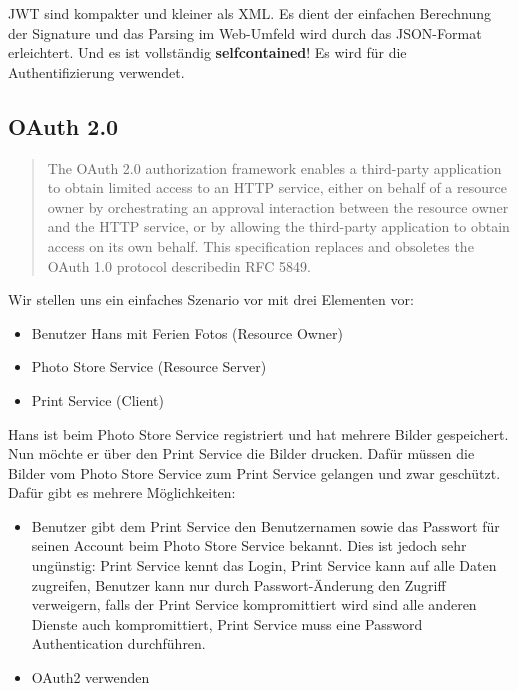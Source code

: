 JWT sind kompakter und kleiner als XML. Es dient der einfachen Berechnung der Signature und das Parsing im Web-Umfeld wird durch das JSON-Format erleichtert. Und es ist vollständig \textbf{selfcontained}! Es wird für die Authentifizierung verwendet.

\subsection{OAuth 2.0}



\begin{quote}
The OAuth 2.0 authorization framework enables a third-party
application to obtain limited access to an HTTP service, either on
behalf of a resource owner by orchestrating an approval interaction
between the resource owner and the HTTP service, or by allowing
the third-party application to obtain access on its own behalf. This
specification replaces and obsoletes the OAuth 1.0 protocol
describedin RFC 5849.
\end{quote}

Wir stellen uns ein einfaches Szenario vor mit drei Elementen vor:

\begin{itemize}
	\item Benutzer Hans mit Ferien Fotos (Resource Owner)
	\item Photo Store Service (Resource Server)
	\item Print Service (Client)
\end{itemize}

Hans ist beim Photo Store Service registriert und hat mehrere Bilder gespeichert. Nun möchte er über den Print Service die Bilder drucken. Dafür müssen die Bilder vom Photo Store Service zum Print Service gelangen und zwar geschützt. Dafür gibt es mehrere Möglichkeiten:

\begin{itemize}
	\item Benutzer gibt dem Print Service den Benutzernamen sowie das Passwort für seinen Account beim Photo Store Service bekannt. Dies ist jedoch sehr ungünstig: Print Service kennt das Login, Print Service kann auf alle Daten zugreifen, Benutzer kann nur durch Passwort-Änderung den Zugriff verweigern, falls der Print Service kompromittiert wird sind alle anderen Dienste auch kompromittiert, Print Service muss eine Password Authentication durchführen.
	
	\item OAuth2 verwenden
\end{itemize}

